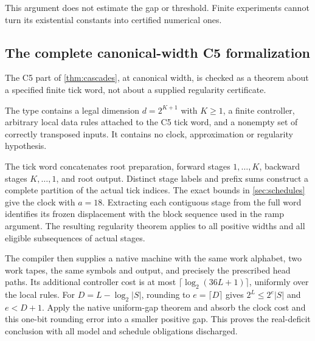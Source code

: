 This argument does not estimate the gap or threshold. Finite experiments
cannot turn its existential constants into certified numerical ones.

\subsection{The complete canonical-width C5 formalization}
\label{sec:c5-formal}

The C5 part of \cref{thm:cascades}, at canonical width, is checked as a
theorem about a specified finite tick word, not about a supplied
regularity certificate.
\begin{outline}
The type  contains a legal
dimension $d=2^{K+1}$ with $K\ge1$, a finite controller, arbitrary local
data rules attached to the C5 tick word, and a nonempty set of correctly
transposed inputs. It contains no clock, approximation or regularity
hypothesis.

The tick word concatenates root preparation, forward stages $1,\ldots,K$,
backward stages $K,\ldots,1$, and root output. Distinct stage labels and
prefix sums construct a complete partition of the actual tick indices.
The exact bounds in \cref{sec:schedules} give the clock with $a=18$.
Extracting each contiguous stage from the full word identifies its
frozen displacement with the block sequence used in the ramp argument.
The resulting regularity theorem applies to all positive widths and all
eligible subsequences of actual stages.

The compiler then supplies a native machine with the same work alphabet,
two work tapes, the same symbols and output, and precisely the prescribed
head paths. Its additional controller cost is at most
$\lceil\log_2(36L+1)\rceil$, uniformly over the local rules.
For $D=L-\log_2|S|$, rounding to $e=\lceil D\rceil$ gives
$2^L\le2^e|S|$ and $e<D+1$. Apply the native uniform-gap theorem and
absorb the clock cost and this one-bit rounding error into a smaller
positive gap. This proves the real-deficit conclusion with all model
and schedule obligations discharged.
\end{outline}


